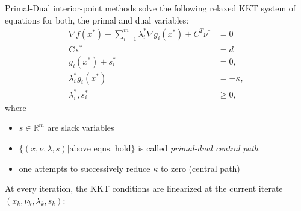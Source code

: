 \newpar{}

Primal-Dual interior-point methods solve the following relaxed KKT system of equations for both, the primal and dual variables:
\begin{align*}
    \nabla f(x^{*})+\sum_{i=1}^{m}\lambda_{i}^{*}\nabla g_{i}(x^{*})+C^{T}\nu^{*} & =0        \\
    \mathrm{Cx^*}                                                                 & =d        \\
    g_i(x^*)+s_i^*                                                                & =0,       \\
    \lambda_{i}^{*}g_{i}(x^{*})                                                   & =-\kappa, \\
    \lambda_{i}^{*},s_{i}^{*}                                                     & \geq0,
\end{align*}
where
\begin{itemize}
    \item $s\in \mathbb{R}^m$ are slack variables
    \item $\{(x,\nu,\lambda,s)|\text{above eqns.\ hold}\}$ is called \textit{primal-dual central path}
    \item one attempts to successively reduce $\kappa$ to zero (central path)
\end{itemize}

\newpar{}
At every iteration, the KKT conditions are linearized at the current iterate $(x_k, \nu_k, \lambda_k, s_k)$:

